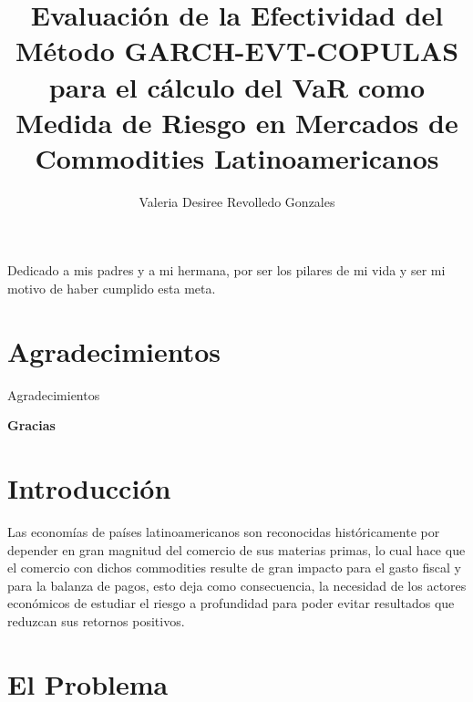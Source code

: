 \documentclass[a4paper,12pt]{Latex/Classes/PhDthesisPSnPDF}
\title{Evaluación de la Efectividad del Método GARCH-EVT-COPULAS para el cálculo del VaR como Medida de Riesgo en Mercados de Commodities Latinoamericanos}
\author{Valeria Desiree Revolledo Gonzales}
\begin{document}


\maketitle									%

\newpage\renewcommand{\thepage}{\arabic{page}}\setcounter{page}{1} 


\begin{dedication}
Dedicado a mis padres y a mi hermana, por ser los pilares de mi vida y ser mi motivo de haber cumplido esta meta.
\end{dedication}
\newpage
\chapter*{Agradecimientos}

Agradecimientos




  \begin{flushright}
  \textbf{Gracias}
  \end{flushright}

\tableofcontents
\listoffigures
\listoftables



\chapter*{Introducción}

Las economías de países latinoamericanos son reconocidas históricamente por depender en gran magnitud del comercio de sus materias primas, lo cual hace que el comercio con dichos commodities resulte de gran impacto para el gasto fiscal y para la balanza de pagos, esto deja como consecuencia, la necesidad de los actores económicos de estudiar el riesgo a profundidad para poder evitar resultados que reduzcan sus retornos positivos.\\ 


\chapter{El Problema}
\end{document}
